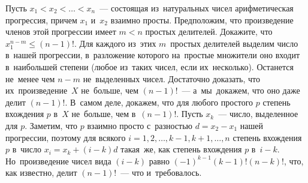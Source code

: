 \problem
Пусть $x_1 < x_2 < \ldots < x_n$~--- состоящая из~натуральных чисел
арифметическая прогрессия, причем $x_1$ и~$x_2$ взаимно просты.
Предположим, что произведение членов этой прогрессии имеет $m < n$ простых
делителей.
Докажите, что $x_1^{n-m} \leq (n-1)!$.
\solution
Для каждого из~этих $m$~простых делителей выделим число в~нашей прогрессии, 
в~разложение которого на~простые множители оно входит в~наибольшей степени
(любое из~таких чисел, если их~несколько).
Останется не~менее чем $n - m$ не~выделенных чисел.
Достаточно доказать, что их~произведение~$X$ не~больше, чем $(n-1)!$~---
а~мы~докажем, что оно даже делит $(n - 1)!$.
В~самом деле, докажем, что для любого простого $p$ степень вхождения $p$ в~$X$
не~больше, чем в~$(n - 1)!$.
Пусть $x_k$~--- число, выделенное для $p$.
Заметим, что $p$ взаимно просто с~разностью $d = x_2 - x_1$ нашей прогрессии,
поэтому для всякого $i = 1, 2, \ldots, k - 1, k + 1, \ldots, n$
степень вхождения $p$ в~число $x_i = x_k + (i - k) d$ такая~же, как степень
вхождения $p$ в~$i - k$.
Но~произведение чисел вида $(i - k)$ равно $(-1)^{k-1} (k - 1)! (n - k)!$,
что, как известно, делит $(n - 1)!$~--- что и~требовалось. 
\endproblem
